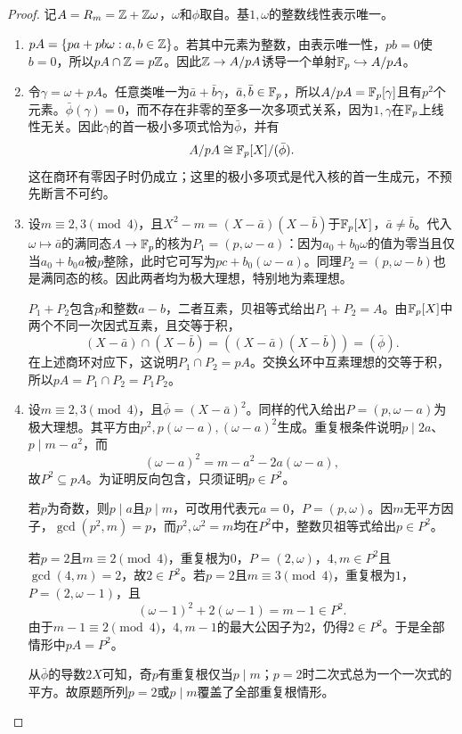 \begin{proof}

记$A=R_m=\mathbb Z+\mathbb Z\omega$，$\omega$和$\phi$取自。基$1,\omega$的整数线性表示唯一。
\begin{enumerate}[label=(\roman*)]
\item $pA=\{pa+pb\omega:a,b\in\mathbb Z\}$。若其中元素为整数，由表示唯一性，$pb=0$使$b=0$，所以$pA\cap\mathbb Z=p\mathbb Z$。因此$\mathbb Z\to A/pA$诱导一个单射$\mathbb F_p\hookrightarrow A/pA$。
\item 令$\gamma=\omega+pA$。任意类唯一为$\bar a+\bar b\gamma$，$\bar a,\bar b\in\mathbb F_p$，所以$A/pA=\mathbb F_p[\gamma]$且有$p^2$个元素。$\bar\phi(\gamma)=0$，而不存在非零的至多一次多项式关系，因为$1,\gamma$在$\mathbb F_p$上线性无关。因此$\gamma$的首一极小多项式恰为$\bar\phi$，并有
\[
A/pA\cong\mathbb F_p[X]/(\bar\phi).
\]
这在商环有零因子时仍成立；这里的极小多项式是代入核的首一生成元，不预先断言不可约。

\item 设$m\equiv2,3\pmod4$，且$X^2-m=(X-\bar a)(X-\bar b)$于$\mathbb F_p[X]$，$\bar a\ne\bar b$。代入$\omega\mapsto\bar a$的满同态$A\to\mathbb F_p$的核为$P_1=(p,\omega-a)$：因为$a_0+b_0\omega$的值为零当且仅当$a_0+b_0a$被$p$整除，此时它可写为$p c+b_0(\omega-a)$。同理$P_2=(p,\omega-b)$也是满同态的核。因此两者均为极大理想，特别地为素理想。

$P_1+P_2$包含$p$和整数$a-b$，二者互素，贝祖等式给出$P_1+P_2=A$。由$\mathbb F_p[X]$中两个不同一次因式互素，且交等于积，
\[
(X-\bar a)\cap(X-\bar b)=((X-\bar a)(X-\bar b))=(\bar\phi).
\]
在上述商环对应下，这说明$P_1\cap P_2=pA$。交换幺环中互素理想的交等于积，所以$pA=P_1\cap P_2=P_1P_2$。

\item 设$m\equiv2,3\pmod4$，且$\bar\phi=(X-\bar a)^2$。同样的代入给出$P=(p,\omega-a)$为极大理想。其平方由$p^2,p(\omega-a),(\omega-a)^2$生成。重复根条件说明$p\mid2a$、$p\mid m-a^2$，而
\[
(\omega-a)^2=m-a^2-2a(\omega-a),
\]
故$P^2\subseteq pA$。为证明反向包含，只须证明$p\in P^2$。

若$p$为奇数，则$p\mid a$且$p\mid m$，可改用代表元$a=0$，$P=(p,\omega)$。因$m$无平方因子，$\gcd(p^2,m)=p$，而$p^2,\omega^2=m$均在$P^2$中，整数贝祖等式给出$p\in P^2$。

若$p=2$且$m\equiv2\pmod4$，重复根为$0$，$P=(2,\omega)$，$4,m\in P^2$且$\gcd(4,m)=2$，故$2\in P^2$。若$p=2$且$m\equiv3\pmod4$，重复根为$1$，$P=(2,\omega-1)$，且
\[
(\omega-1)^2+2(\omega-1)=m-1\in P^2.
\]
由于$m-1\equiv2\pmod4$，$4,m-1$的最大公因子为$2$，仍得$2\in P^2$。于是全部情形中$pA=P^2$。

从$\bar\phi$的导数$2X$可知，奇$p$有重复根仅当$p\mid m$；$p=2$时二次式总为一个一次式的平方。故原题所列$p=2$或$p\mid m$覆盖了全部重复根情形。


\end{enumerate}
\end{proof}
